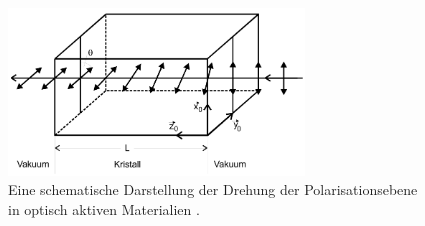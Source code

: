 \begin{figure}[H]
    \centering
    \includegraphics[width=0.7\textwidth]{latex/images/zirk.PNG}
    \caption{Eine schematische Darstellung der Drehung der Polarisationsebene in optisch aktiven Materialien  \protect \cite{anhang}.}
    \label{img:zirk}
\end{figure}

